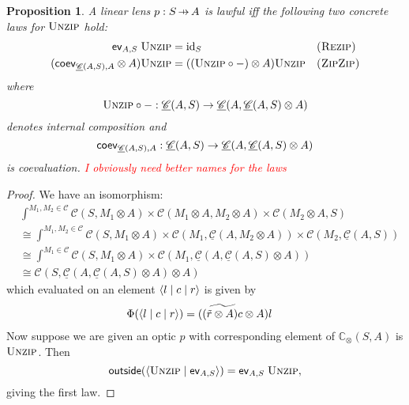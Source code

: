 \documentclass[11pt,a4paper]{article}
\theoremstyle{plain}
\newtheorem{proposition}[theorem]{Proposition}
\theoremstyle{definition}
\newcommand{\C}{\mathscr{C}}
\newcommand{\homC}{\underline{\C}}
\newcommand{\conc}{\mathbb{C}}
\newcommand{\id}{\mathrm{id}}
\newcommand{\rep}[2]{{\ensuremath \left\langle #1 \mid #2 \right\rangle}}
\newcommand{\repthree}[3]{{\ensuremath \langle #1 \mid #2 \mid #3 \rangle}}
\newcommand{\funzip}{\textsc{Unzip}}
\newcommand{\outside}{\mathsf{outside}}
\newcommand{\hto}{\ensuremath{\,\mathaccent\shortmid\rightarrow\,}}
\newcommand{\todo}[1]{\textcolor{red}{\small #1}}
\begin{document}
\begin{proposition}\label{prop:concrete-linear-lawful}
  A linear lens $p : S \hto A$ is lawful iff the following two concrete laws for $\funzip$ hold:
  \begin{align*}
    \ev_{A, S} \; \funzip &= \id_S && \textsc{(Rezip)} \\
    (\coev_{\homC(A, S), A} \otimes A)\funzip &= ((\funzip \circ -) \otimes A)\funzip && \textsc{(ZipZip)}
  \end{align*}
  where \[ \funzip \circ - : \homC(A, S) \to \homC(A, \homC(A, S) \otimes A) \] denotes internal composition and \[\coev_{\homC(A, S), A} : \homC(A, S) \to \homC(A, \homC(A, S) \otimes A)\] is coevaluation.
  \todo{I obviously need better names for the laws}
\end{proposition}
\begin{proof}
  We have an isomorphism:
  \begin{align*}
    & \int^{M_1, M_2 \in \C} \C(S, M_1 \otimes A) \times \C(M_1 \otimes A, M_2 \otimes A) \times \C(M_2 \otimes A, S) \\
    &\cong \int^{M_1, M_2 \in \C} \C(S, M_1 \otimes A) \times \C(M_1, \homC(A, M_2 \otimes A)) \times \C(M_2, \homC(A, S)) \\
    &\cong \int^{M_1 \in \C} \C(S, M_1 \otimes A) \times \C(M_1, \homC(A, \homC(A, S) \otimes A)) \\
    &\cong \C(S, \homC(A, \homC(A, S) \otimes A) \otimes A)
  \end{align*}
  which evaluated on an element $\repthree{l}{c}{r }$ is given by
  \begin{align*}
    \Phi(\repthree{l}{c}{r}) &= (\widetilde{(\tilde{r} \otimes A)c} \otimes A)l
  \end{align*}
  Now suppose we are given an optic $p$ with corresponding element of $\conc_\otimes(S, A)$ is $\funzip$. Then \[\outside(\rep{\funzip }{\ev_{A, S} }) = \ev_{A, S} \; \funzip,\] giving the first law.


\end{proof}
\end{document}
